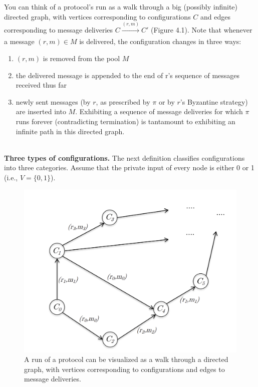 You can think of a protocol’s run as a walk through a big (possibly infinite) directed graph,
with vertices corresponding to configurations $C$ and edges corresponding to message deliveries $C \xrightarrow[]{(r,m)} C'$ (Figure 4.1). Note that whenever a message $(r, m) \in M$ is delivered, the configuration changes in three ways: 
\begin{enumerate}[label=(\roman*)]
    \item $(r, m)$ is removed from the pool $M$
    \item the delivered message is appended to the end of r’s sequence of messages received thus far
    \item newly sent messages (by $r$, as prescribed by $\pi$ or by $r$’s Byzantine strategy) are inserted
into $M$. Exhibiting a sequence of message deliveries for which $\pi$ runs forever (contradicting
termination) is tantamount to exhibiting an infinite path in this directed graph.
\end{enumerate}\\

\noindent
\textbf{Three types of configurations.} The next definition classifies configurations into three
categories. Assume that the private input of every node is either 0 or 1 (i.e., $V = \{0, 1\}$).\\

\begin{figure}[h]
    \centering
    \includegraphics[scale = 0.5]{figures/f14.png}
    \caption{A run of a protocol can be visualized as a walk through a directed graph, with
    vertices corresponding to configurations and edges to message deliveries.}
    \label{fig:mesh1}
\end{figure}\\

